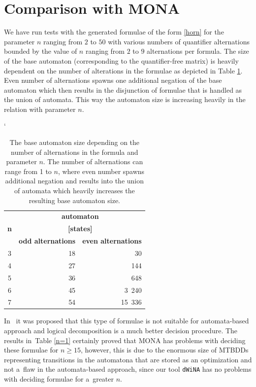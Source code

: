 \section{Comparison with \textsc{MONA}}
We have run tests with the generated formulae of the form \ref{horn} for
the parameter $n$ ranging from $2$ to $50$ with various numbers of quantifier
alternations bounded by the value of $n$ ranging from $2$ to $9$ alternations
per formula.
The size of the base automaton (corresponding to the quantifier-free matrix) is heavily
dependent on the number of alterations in the formulae as depicted in Table
\ref{n-size}. Even number of alternations spawns one additional negation of the
base automaton which then results in the disjunction of formulae that is handled
as the union of automata. This way the automaton size is increasing heavily in
the relation with parameter $n$.

\begin{table}[h!]
\catcode`
 \begin{center}
  \begin{tabular}{| c | r | r |}
  \hline
   \multirow{3}{*}{\textbf{n}} & \multicolumn{2}{|c|}{\textbf{automaton}}\\
                               & \multicolumn{2}{|c|}{\textbf{[states]}}\\
   \cline{2-3}
   & \textbf{odd alternations} & \textbf{even alternations}\\
   \hline
   \hline
   3 & 18 & 30\\
   \hline
   4 & 27 & 144\\
   \hline
   5 & 36 & 648\\
   \hline
   6 & 45 & 3~240\\
   \hline
   7 & 54 & 15~336\\
   \hline
  \end{tabular}
 \end{center}
 \caption{The base automaton size depending on the number of alternations in
 the formula and parameter $n$. The number of alternations can range
 from 1 to $n$, where even number spawns additional negation and
 results into the union of automata which heavily increases the
 resulting base automaton size.}\label{n-size}
\end{table}

In~\cite{logic-approach} it was proposed that this type of formulae is not
suitable for automata-based approach and logical decomposition is a much better
decision procedure. The results in~Table \ref{n=1} certainly proved that
\textsc{MONA} has problems with deciding these formulae for $n \geq 15$,
however, this is due to the enormous size of MTBDDs representing transitions in
the automatona that are stored as an optimization and not a~flaw in the
automata-based approach, since our tool \texttt{dWiNA} has no problems with deciding formulae
for a~greater $n$.

